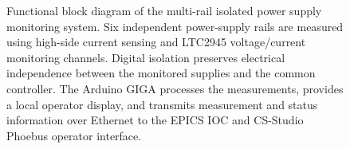 \begin{figure}[H]
{{\begin{minipage}{0.9\textheight}
{%
				}
				
				\vspace{0.25cm}
				
				\caption{
					Functional block diagram of the multi-rail isolated
					power supply monitoring system. Six independent power-supply rails
					are measured using high-side current sensing and LTC2945 voltage/current
					monitoring channels. Digital isolation preserves electrical independence
					between the monitored supplies and the common controller. The Arduino
					GIGA processes the measurements, provides a local operator display, and
					transmits measurement and status information over Ethernet to the EPICS
					IOC and CS-Studio Phoebus operator interface.
				}
				\label{fig:functional-block-diagram}
				
			\end{minipage}%
		}%
	}
	
\end{figure}